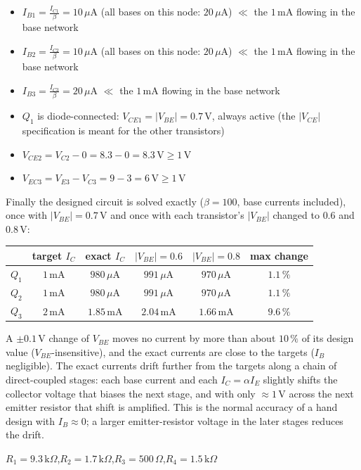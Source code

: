 \documentclass[11pt]{article}
\newcommand{\solstep}[2]{\par\medskip{\color{stepc}\textbf{Step #1 --- #2}}\par\nopagebreak}
\begin{document}
\solstep{4}{Check the design}\begin{itemize}[leftmargin=*,itemsep=2pt]
\item $I_{B1} = \frac{I_{C1}}{\beta} = 10\,\mu \mathrm{A}$ (all bases on this node: $20\,\mu \mathrm{A}$) $\ll$ the $1\,\mathrm{m}\mathrm{A}$ flowing in the base network \checkmark
\item $I_{B2} = \frac{I_{C2}}{\beta} = 10\,\mu \mathrm{A}$ (all bases on this node: $20\,\mu \mathrm{A}$) $\ll$ the $1\,\mathrm{m}\mathrm{A}$ flowing in the base network \checkmark
\item $I_{B3} = \frac{I_{C3}}{\beta} = 20\,\mu \mathrm{A}$ $\ll$ the $1\,\mathrm{m}\mathrm{A}$ flowing in the base network \checkmark
\item $Q_{1}$ is diode-connected: $V_{CE1} = |V_{BE}| = 0.7$\,V, always active (the $|V_{CE}|$ specification is meant for the other transistors) \checkmark
\item $V_{CE2} = V_{C2} - 0 = 8.3 - 0 = 8.3\,\mathrm{V} \ge 1$\,V \checkmark
\item $V_{EC3} = V_{E3} - V_{C3} = 9 - 3 = 6\,\mathrm{V} \ge 1$\,V \checkmark
\end{itemize}
Finally the designed circuit is solved exactly ($\beta=100$, base currents included), once with $|V_{BE}|=0.7$\,V and once with each transistor's $|V_{BE}|$ changed to $0.6$ and $0.8$\,V:\begin{center}\renewcommand{\arraystretch}{1.35}
\begin{tabular}{cccccc}
\toprule
 & target $I_C$ & exact $I_C$ & $|V_{BE}|=0.6$ & $|V_{BE}|=0.8$ & max change \\
\midrule
$Q_{1}$ & $1\,\mathrm{m}\mathrm{A}$ & $980\,\mu \mathrm{A}$ & $991\,\mu \mathrm{A}$ & $970\,\mu \mathrm{A}$ & $1.1\,\%$ \\
$Q_{2}$ & $1\,\mathrm{m}\mathrm{A}$ & $980\,\mu \mathrm{A}$ & $991\,\mu \mathrm{A}$ & $970\,\mu \mathrm{A}$ & $1.1\,\%$ \\
$Q_{3}$ & $2\,\mathrm{m}\mathrm{A}$ & $1.85\,\mathrm{m}\mathrm{A}$ & $2.04\,\mathrm{m}\mathrm{A}$ & $1.66\,\mathrm{m}\mathrm{A}$ & $9.6\,\%$ \\
\bottomrule
\end{tabular}\end{center}
A $\pm0.1$\,V change of $V_{BE}$ moves no current by more than about $10\,\%$ of its design value ($V_{BE}$-insensitive), and the exact currents are close to the targets ($I_B$ negligible). The exact currents drift further from the targets along a chain of direct-coupled stages: each base current and each $I_C = \alpha I_E$ slightly shifts the collector voltage that biases the next stage, and with only $\approx1$\,V across the next emitter resistor that shift is amplified. This is the normal accuracy of a hand design with $I_B\approx0$; a larger emitter-resistor voltage in the later stages reduces the drift.
\begin{ansbox}
$R_{1} = 9.3\,\mathrm{k}\Omega$,\quad $R_{2} = 1.7\,\mathrm{k}\Omega$,\quad $R_{3} = 500\,\Omega$,\quad $R_{4} = 1.5\,\mathrm{k}\Omega$
\end{ansbox}
\end{document}
